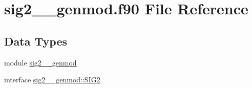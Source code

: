 \hypertarget{sig2____genmod_8f90}{\section{sig2\+\_\+\+\_\+genmod.\+f90 File Reference}
\label{sig2____genmod_8f90}
}
\subsection*{Data Types}
\begin{DoxyCompactItemize}
\item 
module \hyperlink{classsig2____genmod}{sig2\+\_\+\+\_\+genmod}
\item 
interface \hyperlink{interfacesig2____genmod_1_1SIG2}{sig2\+\_\+\+\_\+genmod\+::\+S\+I\+G2}
\end{DoxyCompactItemize}
